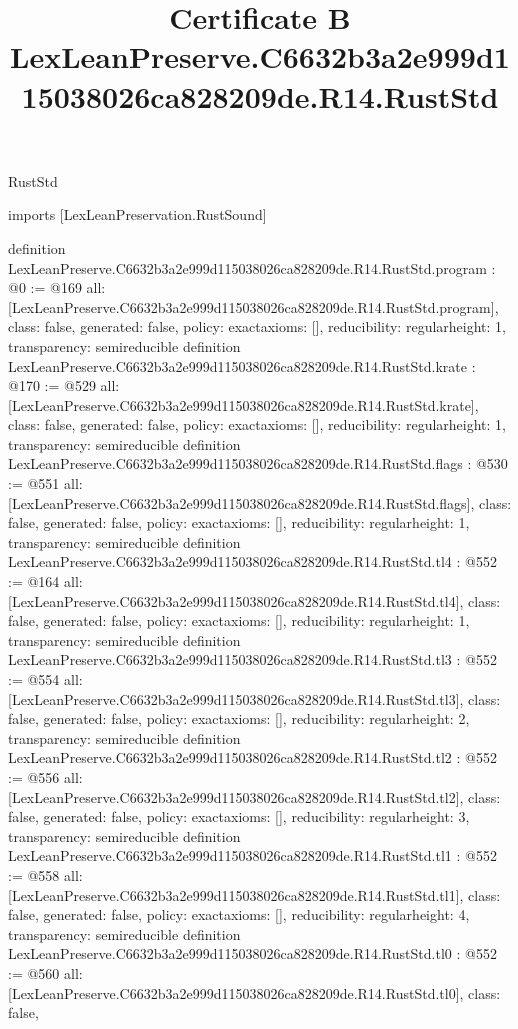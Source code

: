 \begin{lexlean}{RustStd}
\title{Certificate B LexLeanPreserve.C6632b3a2e999d115038026ca828209de.R14.RustStd}
\begin{coremodule}
imports [LexLeanPreservation.RustSound]

definition LexLeanPreserve.C6632b3a2e999d115038026ca828209de.R14.RustStd.program : @0 := @169 {
  all: [LexLeanPreserve.C6632b3a2e999d115038026ca828209de.R14.RustStd.program],
  class: false,
  generated: false,
  policy: exact{axioms: []},
  reducibility: regular{height: 1},
  transparency: semireducible
}
definition LexLeanPreserve.C6632b3a2e999d115038026ca828209de.R14.RustStd.krate : @170 := @529 {
  all: [LexLeanPreserve.C6632b3a2e999d115038026ca828209de.R14.RustStd.krate],
  class: false,
  generated: false,
  policy: exact{axioms: []},
  reducibility: regular{height: 1},
  transparency: semireducible
}
definition LexLeanPreserve.C6632b3a2e999d115038026ca828209de.R14.RustStd.flags : @530 := @551 {
  all: [LexLeanPreserve.C6632b3a2e999d115038026ca828209de.R14.RustStd.flags],
  class: false,
  generated: false,
  policy: exact{axioms: []},
  reducibility: regular{height: 1},
  transparency: semireducible
}
definition LexLeanPreserve.C6632b3a2e999d115038026ca828209de.R14.RustStd.tl4 : @552 := @164 {
  all: [LexLeanPreserve.C6632b3a2e999d115038026ca828209de.R14.RustStd.tl4],
  class: false,
  generated: false,
  policy: exact{axioms: []},
  reducibility: regular{height: 1},
  transparency: semireducible
}
definition LexLeanPreserve.C6632b3a2e999d115038026ca828209de.R14.RustStd.tl3 : @552 := @554 {
  all: [LexLeanPreserve.C6632b3a2e999d115038026ca828209de.R14.RustStd.tl3],
  class: false,
  generated: false,
  policy: exact{axioms: []},
  reducibility: regular{height: 2},
  transparency: semireducible
}
definition LexLeanPreserve.C6632b3a2e999d115038026ca828209de.R14.RustStd.tl2 : @552 := @556 {
  all: [LexLeanPreserve.C6632b3a2e999d115038026ca828209de.R14.RustStd.tl2],
  class: false,
  generated: false,
  policy: exact{axioms: []},
  reducibility: regular{height: 3},
  transparency: semireducible
}
definition LexLeanPreserve.C6632b3a2e999d115038026ca828209de.R14.RustStd.tl1 : @552 := @558 {
  all: [LexLeanPreserve.C6632b3a2e999d115038026ca828209de.R14.RustStd.tl1],
  class: false,
  generated: false,
  policy: exact{axioms: []},
  reducibility: regular{height: 4},
  transparency: semireducible
}
definition LexLeanPreserve.C6632b3a2e999d115038026ca828209de.R14.RustStd.tl0 : @552 := @560 {
  all: [LexLeanPreserve.C6632b3a2e999d115038026ca828209de.R14.RustStd.tl0],
  class: false,
}
\end{coremodule}
\end{lexlean}
